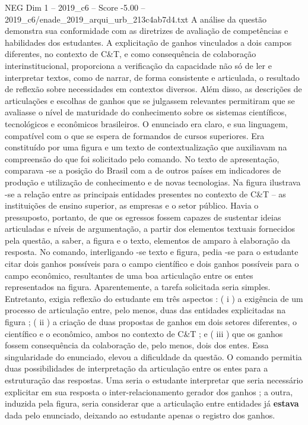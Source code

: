 \begin{textsample}{NEG Dim 1 – 2019\_c6 – Score -5.00 – 2019\_c6/enade\_2019\_arqui\_urb\_213c4ab7d4.txt}
A análise da questão demonstra sua conformidade com as diretrizes de avaliação de competências e habilidades dos estudantes.
A explicitação de ganhos vinculados a dois campos diferentes, no contexto de C\&T, e como consequência de colaboração interinstitucional, proporciona a verificação da capacidade não só de ler e interpretar textos, como de narrar, de forma consistente e articulada, o resultado de reflexão sobre necessidades em contextos diversos.
Além disso, as descrições de articulações e escolhas de ganhos que se julgassem relevantes permitiram que se avaliasse o nível de maturidade do conhecimento sobre os sistemas científicos, tecnológicos e econômicos brasileiros.
O enunciado era claro, e sua linguagem, compatível com o que se espera de formandos de cursos superiores.
Era constituído por uma figura e um texto de contextualização que auxiliavam na compreensão do que foi solicitado pelo comando.
No texto de apresentação, comparava -se a posição do Brasil com a de outros países em indicadores de produção e utilização de conhecimento e de novas tecnologias.
Na figura ilustrava -se a relação entre as principais entidades presentes no contexto de C\&T – as instituições de ensino superior, as empresas e o setor público.
Havia o pressuposto, portanto, de que os egressos fossem capazes de sustentar ideias articuladas e níveis de argumentação, a partir dos elementos textuais fornecidos pela questão, a saber, a figura e o texto, elementos de amparo à elaboração da resposta.
No comando, interligando -se texto e figura, pedia -se para o estudante citar dois ganhos possíveis para o campo científico e dois ganhos possíveis para o campo econômico, resultantes de uma boa articulação entre os entes representados na figura.
Aparentemente, a tarefa solicitada seria simples.
Entretanto, exigia reflexão do estudante em três aspectos : ( i ) a exigência de um processo de articulação entre, pelo menos, duas das entidades explicitadas na figura ; ( ii ) a criação de duas propostas de ganhos em dois setores diferentes, o científico e o econômico, ambos no contexto de C\&T ; e ( iii ) que os ganhos fossem consequência da colaboração de, pelo menos, dois dos entes.
Essa singularidade do enunciado, elevou a dificuldade da questão.
O comando permitia duas possibilidades de interpretação da articulação entre os entes para a estruturação das respostas.
Uma seria o estudante interpretar que seria necessário explicitar em sua resposta o inter-relacionamento gerador dos ganhos ; a outra, induzida pela figura, seria considerar que a articulação entre entidades já \textbf{estava} dada pelo enunciado, deixando ao estudante apenas o registro dos ganhos.

\end{textsample}
